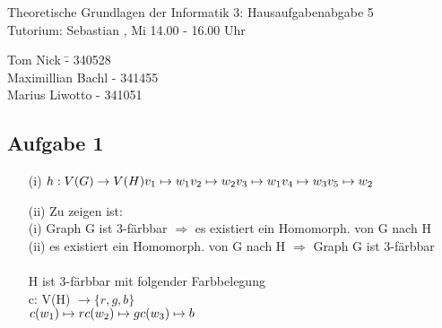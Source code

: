 \documentclass[a4paper,10pt]{article}
\begin{document}
\begin{center}
\Large{Theoretische Grundlagen der Informatik 3: Hausaufgabenabgabe 5} \\
\large{Tutorium: Sebastian , Mi 14.00 - 16.00 Uhr}
\end{center}
\begin{tabbing}
Tom Nick \hspace{2cm}\= - 340528\\
Maximillian Bachl \> - 341455 \\
Marius Liwotto\> -  341051
\end{tabbing}
\subsection*{Aufgabe 1}
\begin{enumerate}
\item[(i)]
\( h: V(G) \rightarrow V(H)\\
v_1 \mapsto w_1 \\
v_2 \mapsto w_2 \\
v_3 \mapsto w_1 \\
v_4 \mapsto w_3 \\
v_5 \mapsto w_2 \)

\item[(ii)]
Zu zeigen ist: \\
(i) Graph G ist 3-färbbar $\Rightarrow$ es existiert ein Homomorph. von G nach H\\
(ii) es existiert ein Homomorph. von G nach H $\Rightarrow$ Graph G ist 3-färbbar\\
\\
H ist 3-färbbar mit folgender Farbbelegung \\
c: V(H) $\rightarrow \{r,g,b\}$ \\
\( c(w_1) \mapsto r \\
c(w_2) \mapsto g \\
c(w_3) \mapsto b \)


\end{enumerate}
\end{document}
